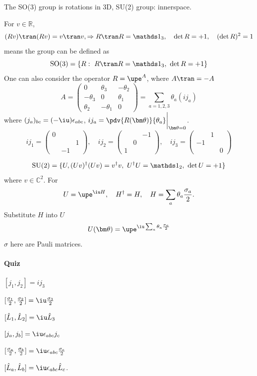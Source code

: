The SO(3) group is rotations in 3D, SU(2) group: innerspace.
\begin{definition}[Rotations in 3D]
  For $v \in \mathbb R$,
  \[
    (Rv)\tran (Rv) = v\tran v, \Rightarrow R\tran R = \identity_3, \quad
    \det R = +1, \quad (\det R)^2 = 1
  \]
  means the group can be defined as
  \[
    \text{SO(3)} = \{R:\ R\tran R = \identity_3,\ \det R = +1\}
  \]
  One can also consider the operator $R = \upe^A$, where $A\tran = -A$
  \[
    A = \begin{pmatrix}
      0 & \theta_3 & -\theta_2\\
      -\theta_3 & 0 & \theta_1\\
      \theta_2 & -\theta_1 & 0
    \end{pmatrix} = \sum_{a = 1,2,3} \theta_a(ij_a)
  \]
  where $(j_a)_{bc} = (-\iu)\epsilon_{abc}$,
  $ij_a = \pdv{R(\bm\theta)}{\theta_a}\bigg|_{\bm\theta = 0}$.
  \[
    ij_1 = \begin{pmatrix}
      0 & \\&
      & 1\\ & -1
    \end{pmatrix},\quad
    ij_2 = \begin{pmatrix}
      & & -1\\
      & 0\\1
    \end{pmatrix},\quad
    ij_3 = \begin{pmatrix}
      & 1\\
      -1\\
      & & 0
    \end{pmatrix}
  \]
\end{definition}
\begin{definition}
  \[
    \text{SU(2)} = \{U, (Uv)^\dagger (Uv) = v^\dagger v,\
    U^\dagger U = \identity_2,\ \det U = +1\}
  \]
  where $v \in \mathbb C^2$. For
  \[
    U = \upe^{\iu H},\quad H^\dagger = H, \quad
    H = \sum_a \theta_a \frac{\sigma_a}{2}.
  \]
  Substitute $H$ into $U$
  \[
    U(\bm\theta) = \upe^{\iu\sum_a \theta_a \frac{\sigma_a}{2}}
  \]
  $\sigma$ here are Pauli matrices.
  \paragraph{Quiz}
  \begin{enumext}[columns = 3]
    \item $[j_1, j_2] = ij_3$
    \item $[\frac{\sigma_1}{2}, \frac{\sigma_2}{2}] = \iu\frac{\sigma_3}{2}$
    \item $[\hat L_1, \hat L_2] = \iu\hat L_3$
    \item $[j_a, j_b] = \iu\epsilon_{abc} j_c$
    \item $[\frac{\sigma_a}{2}, \frac{\sigma_b}{2}]
        = \iu\epsilon_{abc} \frac{\sigma_c}{2}$
    \item $[\hat L_a, \hat L_b] = \iu\epsilon_{abc} \hat L_c$.
  \end{enumext}
\end{definition}

